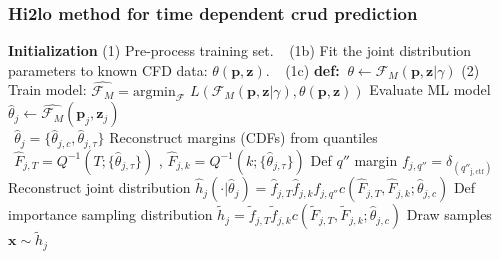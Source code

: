 \documentclass[t, pdftex]{beamer}
\makeatletter
\def\beamer@writeslidentry@miniframesoff{%
    \expandafter\beamer@ifempty\expandafter{\beamer@framestartpage}{}%
    {%
        \clearpage\beamer@notesactions%
    }
}
\newcommand*{\miniframesoff}{\let\beamer@writeslidentry=\beamer@writeslidentry@miniframesoff}
\makeatother
\begin{document}
\miniframesoff
\lastframe%


\begin{frame}
\frametitle{\small Hi2lo method for time dependent crud prediction}
\vspace{-22pt}
\begin{algorithm}[H]
    \tiny      
    \begin{algorithmic}[1]      
        \STATE \textbf{Initialization}  
        \STATE (1) Pre-process training set.  
        \STATE $\ \ $   (1b) Fit the joint distribution parameters to known CFD data: $\theta(\mathbf p, \mathbf z)$.  
        \STATE $\ \ $   (1c) \textbf{def:}  $\ \theta \leftarrow \mathcal F_M(\mathbf p, \mathbf z | \gamma)$
        \STATE (2) Train model:  $\hat{\mathcal F_M} =  \mathrm{argmin}_{\mathcal F}$
        $L(\mathcal{F}_M (\mathbf p, \mathbf z| \gamma), \theta(\mathbf p, \mathbf z)) $
        \STATE Evaluate ML model $\hat \theta_j \leftarrow \hat{\mathcal F_M}(\mathbf p_j, \mathbf z_j)$ \\
        $\ \ \hat \theta_j = \{\hat \theta_{j,c}, \hat \theta_{j,\tau} \}$
        \STATE Reconstruct margins (CDFs) from quantiles  \\
        $\ \ \hat F_{j,T}= Q^{-1}(T; \{\hat{\theta}_{j,\tau} \})$ , $\hat F_{j,k}= Q^{-1}(k; \{\hat{\theta}_{j,\tau} \})$
        \STATE Def $q''$ margin  $f_{j,q''} = \delta_{(q''_\mathrm{j,ctf})}$
        \STATE Reconstruct joint distribution $\hat h_j(\cdot |\hat \theta_j) = \hat f_{j,T} \hat f_{j,k} f_{j,q''} c(\hat F_{j,T}, \hat F_{j,k}; \hat \theta_{j,c})$ \;
        \ENDFOR
        \STATE Def importance sampling distribution $\tilde h_j = \tilde f_{j,T} \tilde f_{j,k} c(\tilde F_{j,T}, \tilde F_{j,k}; \hat \theta_{j,c}) $
        \STATE Draw samples $\mathbf x \sim \tilde h_j$ \;

\end{algorithmic}
\end{algorithm}
\end{frame}
\end{document}
